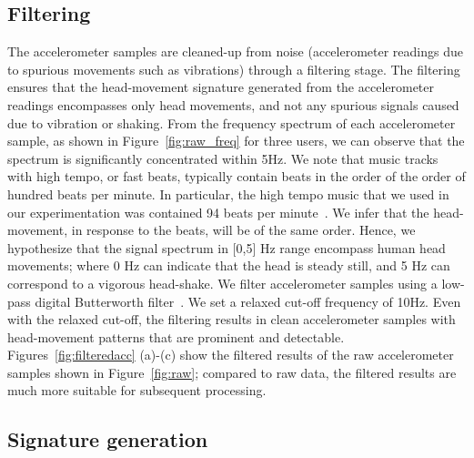 \subsection{Filtering}

The accelerometer samples are cleaned-up from noise (accelerometer
readings due to spurious movements such as vibrations) through
a filtering stage.
The filtering ensures that the head-movement signature
generated from the accelerometer readings encompasses
only head movements, and not any spurious signals caused due to
vibration or shaking. From the frequency
spectrum of each accelerometer sample, as shown in 
Figure~\ref{fig:raw_freq} 
for three users, we can observe that the spectrum is significantly
concentrated within 5Hz.
We note that music tracks with high tempo, or fast beats, typically contain
beats in the order of the order of hundred beats per minute.
In particular, the high tempo music that we used in our experimentation was 
contained 94 beats per minute~\cite{beats}.
We infer that the head-movement, in response
to the beats, will be of the same order. Hence, we hypothesize that
the signal spectrum in [0,5] Hz range encompass
human head movements; where 0 Hz can indicate that the head is
steady still, and 5 Hz can correspond to a vigorous head-shake.
We filter accelerometer samples using a low-pass digital Butterworth
filter~\cite{challis1983design}. We set a relaxed cut-off frequency of 10Hz.
Even with the relaxed cut-off, the filtering results in
clean accelerometer samples with head-movement patterns
that are prominent and detectable. 
Figures~\ref{fig:filteredacc} (a)-(c) show the filtered results of the raw accelerometer 
samples shown in 
Figure~\ref{fig:raw}; 
compared to raw data, the filtered results are much more 
suitable for subsequent processing.


\subsection{Signature generation}

